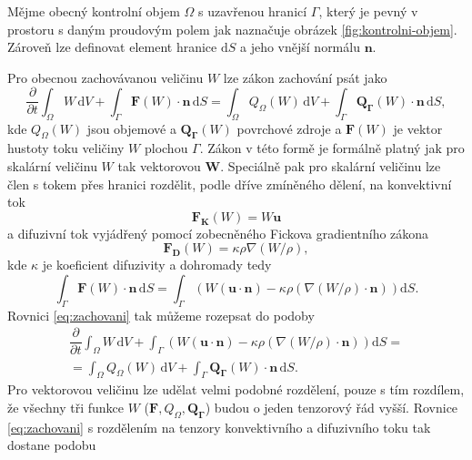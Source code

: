 Mějme obecný kontrolní objem $\Omega$ s uzavřenou hranicí $\Gamma$, který je pevný v prostoru s daným proudovým polem jak naznačuje obrázek \ref{fig:kontrolni-objem}. Zároveň lze definovat element hranice $\mathrm{d}S$ a jeho vnější normálu $\mathbf{n}$.

Pro obecnou zachovávanou veličinu $W$ lze zákon zachování psát jako
\begin{equation}\label{eq:zachovani}
\dfrac{\partial}{\partial t} \int_{\Omega}W\,\mathrm{d}V + \int_{\Gamma}\mathbf{F}(W) \cdot \mathbf{n} \, \mathrm{d}S = \int_{\Omega}Q_\Omega(W) \, \mathrm{d}V + \int_{\Gamma} \mathbf{Q_\Gamma}(W) \cdot \mathbf{n} \, \mathrm{d}S,
\end{equation}
kde $Q_{\Omega}(W)$ jsou objemové a  $\mathbf{Q_\Gamma}(W)$ povrchové zdroje a $\mathbf{F}(W) $ je vektor hustoty toku veličiny $W$ plochou $\Gamma$. Zákon v této formě je formálně platný jak pro skalární veličinu $W$ tak vektorovou $\mathbf{W}$. Speciálně pak pro skalární veličinu lze člen s tokem přes hranici rozdělit, podle dříve zmíněného dělení, na konvektivní tok
\begin{equation}\label{eq:konv_tok}
\mathbf{F_K}(W) = W\mathbf{u}
\end{equation}
a difuzivní tok vyjádřený pomocí zobecněného Fickova gradientního zákona
\begin{equation}\label{eq:diff_tok}
\mathbf{F_D}(W) = \kappa \rho \nabla(W/\rho),
\end{equation}
kde $\kappa$ je koeficient difuzivity a dohromady tedy
\begin{equation}
\int_{\Gamma}\mathbf{F}(W) \cdot \mathbf{n} \, \mathrm{d}S = \int_{\Gamma}\left(W\left(\mathbf{u}\cdot\mathbf{n}\right) - \kappa \rho \left(\nabla(W/\rho)\cdot \mathbf{n} \right)\right) \mathrm{d}S.
\end{equation}
Rovnici \ref{eq:zachovani} tak můžeme rozepsat do podoby
\begin{multline}\label{eq:zachovani_skalarStoky}
\dfrac{\partial}{\partial t} \int_{\Omega}W\,\mathrm{d}V + \int_{\Gamma}\left(W\left(\mathbf{u}\cdot\mathbf{n}\right) - \kappa \rho \left(\nabla(W/\rho)\cdot \mathbf{n} \right)\right) \mathrm{d}S = \\ = \int_{\Omega}Q_\Omega(W) \, \mathrm{d}V + \int_{\Gamma} \mathbf{Q_\Gamma}(W) \cdot \mathbf{n} \, \mathrm{d}S.
\end{multline}
Pro vektorovou veličinu lze udělat velmi podobné rozdělení, pouze s tím rozdílem, že všechny tři funkce $W$ ($\mathbf{F}, Q_{\Omega}, \mathbf{Q_\Gamma}$) budou o jeden tenzorový řád vyšší. Rovnice \ref{eq:zachovani} s rozdělením na tenzory konvektivního a difuzivního toku tak dostane podobu
